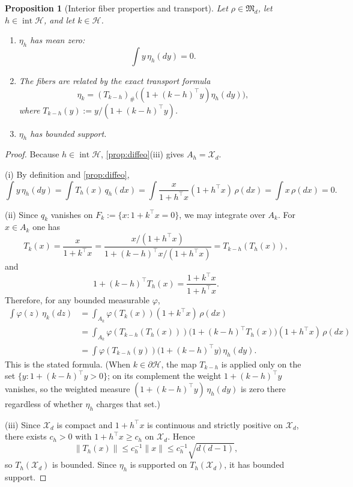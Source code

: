 \documentclass[11pt]{amsart}
\newtheorem{proposition}[proposition]{Proposition}
\theoremstyle{definition}
\newcommand{\cX}{\mathcal X}
\newcommand{\cH}{\mathcal H}
\newcommand{\fM}{\mathfrak M}
\begin{document}
\begin{proposition}[Interior fiber properties and transport]\label{prop:fiber-props}
Let $\rho\in\fM_d$, let $h\in\operatorname{int}\cH$, and let $k\in\cH$.
\begin{enumerate}[label=\textup{(\roman*)}]
\item $\eta_h$ has mean zero:
\[
\int y\,\eta_h(dy)=0.
\]
\item The fibers are related by the exact transport formula
\[
\eta_k=(T_{k-h})_\#\bigl((1+(k-h)^\top y)\eta_h(dy)\bigr),
\]
where $T_{k-h}(y):=y/(1+(k-h)^\top y)$.
\item $\eta_h$ has bounded support.
\end{enumerate}
\end{proposition}

\begin{proof}
Because $h\in \operatorname{int}\cH$, \cref{prop:diffeo}(iii) gives $A_h=\cX_d$.

(i) By definition and \cref{prop:diffeo},
\[
\int y\,\eta_h(dy)
=
\int T_h(x)\,q_h(dx)
=
\int \frac{x}{1+h^\top x}(1+h^\top x)\,\rho(dx)
=
\int x\,\rho(dx)=0.
\]

(ii) Since $q_k$ vanishes on $F_k:=\{x:1+k^\top x=0\}$, we may integrate over $A_k$. For $x\in A_k$ one has
\[
T_k(x)=\frac{x}{1+k^\top x}
=
\frac{x/(1+h^\top x)}{1+(k-h)^\top x/(1+h^\top x)}
=
T_{k-h}(T_h(x)),
\]
and
\[
1+(k-h)^\top T_h(x)=\frac{1+k^\top x}{1+h^\top x}.
\]
Therefore, for any bounded measurable $\varphi$,
\[
\begin{aligned}
\int \varphi(z)\,\eta_k(dz)
&=
\int_{A_k}\varphi(T_k(x))(1+k^\top x)\,\rho(dx)\\
&=
\int_{A_k}\varphi(T_{k-h}(T_h(x)))\bigl(1+(k-h)^\top T_h(x)\bigr)(1+h^\top x)\,\rho(dx)\\
&=
\int \varphi(T_{k-h}(y))\bigl(1+(k-h)^\top y\bigr)\,\eta_h(dy).
\end{aligned}
\]
This is the stated formula. (When $k\in\partial\cH$, the map $T_{k-h}$ is applied only on the set $\{y:1+(k-h)^\top y>0\}$; on its complement the weight $1+(k-h)^\top y$ vanishes, so the weighted measure $(1+(k-h)^\top y)\,\eta_h(dy)$ is zero there regardless of whether $\eta_h$ charges that set.)

(iii) Since $\cX_d$ is compact and $1+h^\top x$ is continuous and strictly positive on $\cX_d$, there exists $c_h>0$ with $1+h^\top x\ge c_h$ on $\cX_d$. Hence
\[
\|T_h(x)\|\le c_h^{-1}\|x\|\le c_h^{-1}\sqrt{d(d-1)},
\]
so $T_h(\cX_d)$ is bounded. Since $\eta_h$ is supported on $T_h(\cX_d)$, it has bounded support.
\end{proof}
\end{document}
